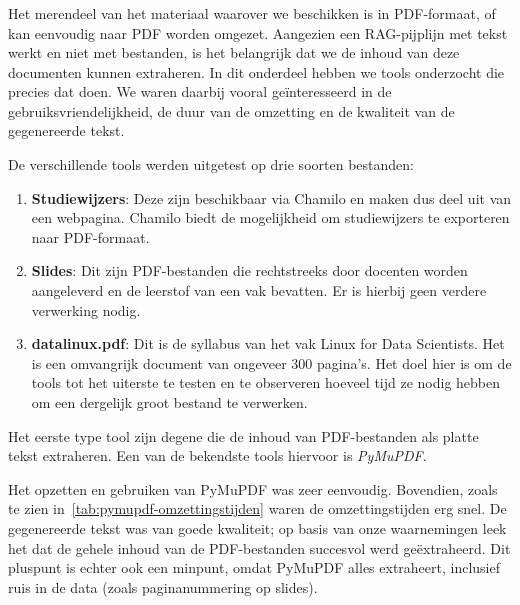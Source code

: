 \subsubsection{}%
\label{subsubsec:onderzoek-tekstextractie}

Het merendeel van het materiaal waarover we beschikken is in PDF-formaat, of kan eenvoudig naar PDF worden omgezet. Aangezien een RAG-pijplijn met tekst werkt en niet met bestanden, is het belangrijk dat we de inhoud van deze documenten kunnen extraheren. In dit onderdeel hebben we tools onderzocht die precies dat doen. We waren daarbij vooral geïnteresseerd in de gebruiksvriendelijkheid, de duur van de omzetting en de kwaliteit van de gegenereerde tekst.

De verschillende tools werden uitgetest op drie soorten bestanden:

\begin{enumerate} 
    \item \textbf{Studiewijzers}: Deze zijn beschikbaar via Chamilo en maken dus deel uit van een webpagina. Chamilo biedt de mogelijkheid om studiewijzers te exporteren naar PDF-formaat.
    \item \textbf{Slides}: Dit zijn PDF-bestanden die rechtstreeks door docenten worden aangeleverd en de leerstof van een vak bevatten. Er is hierbij geen verdere verwerking nodig.
    \item \textbf{datalinux.pdf}: Dit is de syllabus van het vak Linux for Data Scientists. Het is een omvangrijk document van ongeveer 300 pagina’s. Het doel hier is om de tools tot het uiterste te testen en te observeren hoeveel tijd ze nodig hebben om een dergelijk groot bestand te verwerken.
\end{enumerate}

Het eerste type tool zijn degene die de inhoud van PDF-bestanden als platte tekst extraheren. Een van de bekendste tools hiervoor is \emph{PyMuPDF}. 

Het opzetten en gebruiken van PyMuPDF was zeer eenvoudig. Bovendien, zoals te zien in~\ref{tab:pymupdf-omzettingstijden} waren de omzettingstijden erg snel. De gegenereerde tekst was van goede kwaliteit; op basis van onze waarnemingen leek het dat de gehele inhoud van de PDF-bestanden succesvol werd geëxtraheerd. Dit pluspunt is echter ook een minpunt, omdat PyMuPDF alles extraheert, inclusief ruis in de data (zoals paginanummering op slides).

